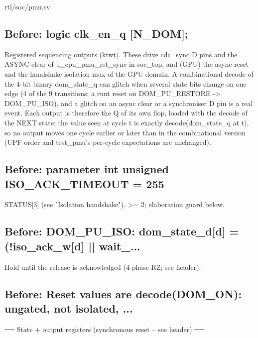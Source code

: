 \begin{relocated}{rtl/soc/pmu.sv}
\subsection*{Before: logic clk\_en\_q      [N\_DOM];}

\begin{textblock}
Registered sequencing outputs (ktwt). These drive cdc_sync D pins and the
ASYNC clear of u_cpu_pmu_rst_sync in soc_top, and (GPU) the async reset
and the handshake isolation mux of the GPU domain. A combinational
decode of the 4-bit binary dom_state_q can glitch when several state
bits change on one edge (4 of the 9 transitions; a runt reset on
DOM_PU_RESTORE -> DOM_PU_ISO), and a glitch on an async clear or a
synchroniser D pin is a real event. Each output is therefore the Q of
its own flop, loaded with the decode of the NEXT state: the value seen
at cycle t is exactly decode(dom_state_q at t), so no output moves one
cycle earlier or later than in the combinational version (UPF order and
test_pmu's per-cycle expectations are unchanged).
\end{textblock}

\subsection*{Before: parameter int unsigned ISO\_ACK\_TIMEOUT = 255}

\begin{textblock}
STATUS[3] (see "Isolation handshake"). >= 2; elaboration guard below.
\end{textblock}

\subsection*{Before: DOM\_PU\_ISO:     dom\_state\_d[d] = (!iso\_ack\_w[d] || wait\_...}

\begin{textblock}
Hold until the release is acknowledged (4-phase RZ; see header).
\end{textblock}

\subsection*{Before: Reset values are decode(DOM\_ON): ungated, not isolated, ...}

\begin{textblock}
── State + output registers (synchronous reset -- see header) ──
\end{textblock}

\end{relocated}

